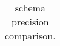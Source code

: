 \begin{table}
{\begin{tabular}{lc@{\hs}rrc@{\s}rrc@{\s}rrc@{\s}rrc@{\s}rrc@{\s}rr}
\bottomrule
\end{tabular}
}
\caption{\Gls{schema} precision comparison.}
\label{tab:precision-schema}
\end{table}
